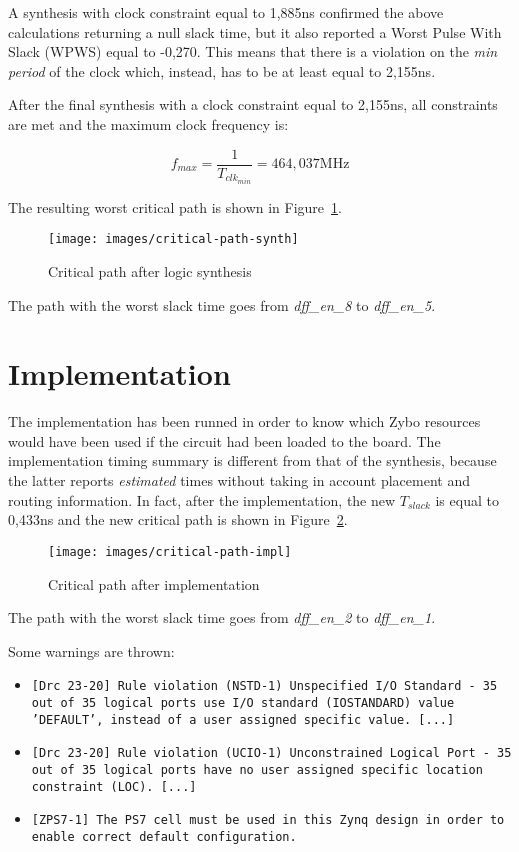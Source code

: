 \documentclass[11pt,a4paper,oneside, openright]{article}
\begin{document}
A synthesis with clock constraint equal to 1,885ns confirmed the above calculations returning a null slack time, but it also reported a Worst Pulse With Slack (WPWS) equal to -0,270. This means that there is a violation on the \textit{min period} of the clock which, instead, has to be at least equal to 2,155ns.

After the final synthesis with a clock constraint equal to 2,155ns, all constraints are met and the maximum clock frequency is:

$$ f_{max} = \frac{1}{T_{clk_{min}}} = 464,037 \text{MHz} $$

The resulting worst critical path is shown in Figure~\ref{fig:critical-path-synth}.

\begin{figure}[h]
    \centering
    \texttt{[image: images/critical-path-synth]}
    \caption{Critical path after logic synthesis}
    \label{fig:critical-path-synth}
\end{figure}

The path with the worst slack time goes from \textit{dff\_en\_8} to \textit{dff\_en\_5}.

\newpage

\section{Implementation}
The implementation has been runned in order to know which Zybo resources would have been used if the circuit had been loaded to the board.
The implementation timing summary is different from that of the synthesis, because the latter reports \textit{estimated} times without taking in account placement and routing information. In fact, after the implementation, the new $T_{slack}$ is equal to 0,433ns and the new critical path is shown in Figure~\ref{fig:critical-path-impl}.

\begin{figure}[h]
    \centering
    \texttt{[image: images/critical-path-impl]}
    \caption{Critical path after implementation}
    \label{fig:critical-path-impl}
\end{figure}

The path with the worst slack time goes from \textit{dff\_en\_2} to \textit{dff\_en\_1}.

Some warnings are thrown:
\begin{itemize}
    \item \texttt{[Drc 23-20] Rule violation (NSTD-1) Unspecified I/O Standard - 35 out of 35 logical ports use I/O standard (IOSTANDARD) value 'DEFAULT', instead of a user assigned specific value. [...]}
    \item \texttt{[Drc 23-20] Rule violation (UCIO-1) Unconstrained Logical Port - 35 out of 35 logical ports have no user assigned specific location constraint (LOC). [...]}
    \item \texttt{[ZPS7-1] The PS7 cell must be used in this Zynq design in order to enable correct default configuration.}
\end{itemize}
\end{document}
